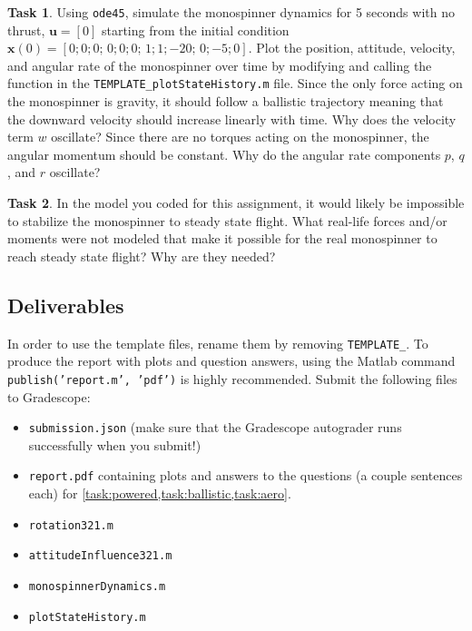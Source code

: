 \documentclass{article}
\theoremstyle{definition}
\newtheorem{task}{Task}
\begin{document}
\begin{task}\label{task:ballistic}
    Using \texttt{ode45}, simulate the monospinner dynamics for 5 seconds with no thrust, $\textbf{u}=[0]$ starting from the initial condition $\textbf{x}(0) = [0; 0; 0;\,  0; 0; 0;\, 1; 1; -20;\, 0; -5; 0]$. Plot the position, attitude, velocity, and angular rate of the monospinner over time by modifying and calling the function in the \texttt{TEMPLATE\_plotStateHistory.m} file. Since the only force acting on the monospinner is gravity, it should follow a ballistic trajectory meaning that the downward velocity should increase linearly with time. Why does the velocity term $w$ oscillate? Since there are no torques acting on the monospinner, the angular momentum should be constant. Why do the angular rate components $p$, $q$, and $r$ oscillate?
\end{task}

\begin{task}\label{task:aero}
    In the model you coded for this assignment, it would likely be impossible to stabilize the monospinner to steady state flight. What real-life forces and/or moments were not modeled that make it possible for the real monospinner to reach steady state flight? Why are they needed?
\end{task}

\subsection*{Deliverables}
In order to use the template files, rename them by removing \texttt{TEMPLATE\_}. To produce the report with plots and question answers, using the Matlab command \texttt{publish('report.m', 'pdf')} is highly recommended. Submit the following files to Gradescope:
\begin{itemize}[noitemsep]
    \item \texttt{submission.json} (make sure that the Gradescope autograder runs successfully when you submit!)
    \item \texttt{report.pdf} containing plots and answers to the questions (a couple sentences each) for \cref{task:powered,task:ballistic,task:aero}.
    \item \texttt{rotation321.m}
    \item \texttt{attitudeInfluence321.m}
    \item \texttt{monospinnerDynamics.m}
    \item \texttt{plotStateHistory.m}
\end{itemize}



\end{document}
